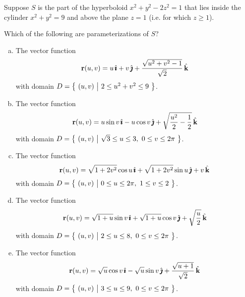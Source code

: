 \begin{question}[M317 2009A] %
Suppose $S$ is the part of the hyperboloid $x^2 + y^2 - 2z^2 = 1$ 
that lies inside the cylinder $x^2 + y^2 = 9$ and above the plane $z = 1$ 
(i.e. for which $z \ge 1$).

Which of the following are parameterizations of $S$? 
%

\begin{enumerate}[(a)]
\item  %
The vector function 
\begin{equation*}
\mathbf{r}(u,v) = u\,\hat{\pmb{\imath}}  + v\,\hat{\pmb{\jmath}} +\frac{\sqrt{u^2+v^2-1}}{\sqrt{2}}\,\hat{\mathbf{k}}
\end{equation*}
with domain $D=\big\{ \ (u,v)\ \big|\  2 \le u^2+v^2 \le 9\ \big\}$.


\item  %
The vector function 
\begin{equation*}
\mathbf{r}(u,v) = u\sin v\,\hat{\pmb{\imath}}  - u\cos v\,\hat{\pmb{\jmath}} +\sqrt{\frac{u^2}{2}-\frac{1}{2}}\,\hat{\mathbf{k}}
\end{equation*}
with domain $D=\big\{ \ (u,v)\ \big|\  \sqrt{3} \le u\le 3,\ 0\le v\le 2\pi\ \big\}$.

\item  %
The vector function 
\begin{equation*}
\mathbf{r}(u,v) = \sqrt{1+2v^2}\cos u\,\hat{\pmb{\imath}}  + \sqrt{1+2v^2} \sin u\,\hat{\pmb{\jmath}} +v\,\hat{\mathbf{k}}
\end{equation*}
with domain $D=\Set{(u,v)}{ 0\le u\le 2\pi,\ 1\le v\le 2}$.


\item  %
The vector function 
\begin{equation*}
\mathbf{r}(u,v) = \sqrt{1+u}\sin v\,\hat{\pmb{\imath}}  + \sqrt{1+u} \cos v\,\hat{\pmb{\jmath}} 
                                  +\sqrt{\frac{u}{2}}\,\hat{\mathbf{k}}
\end{equation*}
with domain $D=\big\{ \ (u,v)\ \big|\  2\le u\le 8,\ 0\le v\le 2\pi\ \big\}$.


\item  %
The vector function 
\begin{equation*}
\mathbf{r}(u,v) = \sqrt{u}\cos v\,\hat{\pmb{\imath}}  - \sqrt{u} \sin v\,\hat{\pmb{\jmath}} 
                                  +\frac{\sqrt{u+1}}{\sqrt{2}}\,\hat{\mathbf{k}}
\end{equation*}
with domain $D=\big\{ \ (u,v)\ \big|\  3\le u\le 9,\ 0\le v\le 2\pi\ \big\}$.

\end{enumerate}
\end{question}

